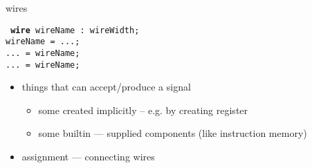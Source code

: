 
\begin{frame}{wires}

{\tt\small
\textbf{wire} wireName : wireWidth; \\
wireName = ...; \\
... = wireName; \\
... = wireName;
}
    \begin{itemize}
    \item things that can accept/produce a signal
        \begin{itemize}
        \item some created implicitly -- e.g. by creating register
        \item some builtin --- supplied components (like instruction memory)
        \end{itemize}
    \item assignment --- connecting wires
    \end{itemize}
\end{frame}

